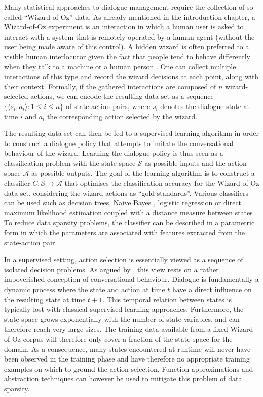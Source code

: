 Many statistical approaches to dialogue management require the collection of so-called ``Wizard-of-Oz'' data.  As already mentioned in the introduction chapter, a Wizard-of-Oz experiment is an interaction in which a human user is asked to interact with a system that is remotely operated by a human agent (without the user being made aware of this control).  A hidden wizard is often preferred to a visible human interlocutor given the fact that people tend to behave differently when they talk to a machine or a human person \citep{JonnsonD88}.  One can collect multiple interactions of this type and record the wizard decisions at each point, along with their context.  Formally, if the gathered interactions are composed of $n$ wizard-selected actions, we can encode the resulting data set as a sequence $\{\langle s_i, a_i \rangle : 1 \leq i \leq n\}$ of state-action pairs, where $s_i$ denotes the dialogue state at time $i$ and $a_i$ the corresponding action selected by the wizard. 

The resulting data set can then be fed to a supervised learning algorithm in order to construct a dialogue policy that attempts to imitate the conversational behaviour of the wizard.  Learning the dialogue policy is thus seen as a classification problem with the state space $\mathcal{S}$ as possible inputs and the action space $\mathcal{A}$ as possible outputs. The goal of the learning algorithm is to construct a classifier $C: \mathcal{S} \rightarrow \mathcal{A}$ that optimises the classification accuracy for the Wizard-of-Oz data set, considering the wizard actions as ``gold standards''.  Various classifiers can be used such as decision trees, Naive Bayes \citep{williams2003}, logistic regression \citep{rieser2006} or direct maximum likelihood estimation coupled with a distance measure between states \citep{Hurtado:2005}.  To reduce data sparsity problems, the classifier can be described in a parametric form in which the parameters are associated with features extracted from the state-action pair.
 
In a supervised setting, action selection is essentially viewed as a sequence of isolated decision problems.  As argued by \cite{817450}, this view rests on a rather impoverished conception of conversational behaviour. Dialogue is fundamentally a dynamic process where the state and action at time $t$ have a direct influence on the resulting state at time $t+1$.  This temporal relation between states is typically lost with classical supervised learning approaches. Furthermore, the state space grows exponentially with the number of state variables, and can therefore reach very large sizes.  The training data available from a fixed Wizard-of-Oz corpus will therefore only cover a fraction of the state space for the domain.  As a consequence, many states encountered at runtime will never have been observed in the training phase and have therefore no appropriate training examples on which to ground the action selection.  Function approximations and abstraction techniques can however be used to mitigate this problem of data sparsity. 

